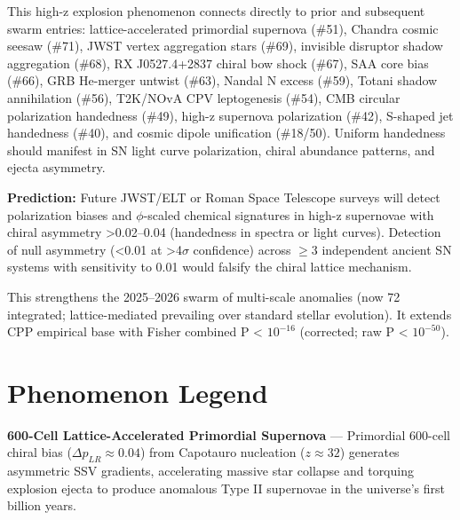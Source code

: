 \documentclass[11pt]{article}
\begin{document}
This high-z explosion phenomenon connects directly to prior and subsequent swarm entries: lattice-accelerated primordial supernova (\#51), Chandra cosmic seesaw (\#71), JWST vertex aggregation stars (\#69), invisible disruptor shadow aggregation (\#68), RX J0527.4+2837 chiral bow shock (\#67), SAA core bias (\#66), GRB He-merger untwist (\#63), Nandal N excess (\#59), Totani shadow annihilation (\#56), T2K/NOvA CPV leptogenesis (\#54), CMB circular polarization handedness (\#49), high-z supernova polarization (\#42), S-shaped jet handedness (\#40), and cosmic dipole unification (\#18/50). Uniform handedness should manifest in SN light curve polarization, chiral abundance patterns, and ejecta asymmetry.

\textbf{Prediction:} Future JWST/ELT or Roman Space Telescope surveys will detect polarization biases and $\phi$-scaled chemical signatures in high-z supernovae with chiral asymmetry >0.02--0.04 (handedness in spectra or light curves). Detection of null asymmetry (<0.01 at >4$\sigma$ confidence) across $\geq 3$ independent ancient SN systems with sensitivity to 0.01 would falsify the chiral lattice mechanism.

This strengthens the 2025--2026 swarm of multi-scale anomalies (now 72 integrated; lattice-mediated prevailing over standard stellar evolution). It extends CPP empirical base with Fisher combined P < $10^{-16}$ (corrected; raw P < $10^{-50}$).

\section{Phenomenon Legend}
\textbf{600-Cell Lattice-Accelerated Primordial Supernova} — Primordial 600-cell chiral bias ($\Delta p_{LR} \approx 0.04$) from Capotauro nucleation ($z \approx 32$) generates asymmetric SSV gradients, accelerating massive star collapse and torquing explosion ejecta to produce anomalous Type II supernovae in the universe's first billion years.
\end{document}
